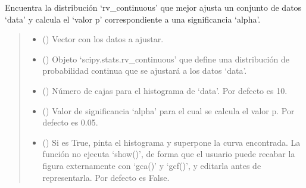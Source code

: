 \documentclass[letterpaper,10pt,english]{sphinxmanual}
\begin{document}
\begin{fulllineitems}
\label{\detokenize{myutils:myutils.stats.fit_rv_cont}}
\pysigstartsignatures
{}
\pysigstopsignatures
\sphinxAtStartPar
Encuentra la distribución ‘rv\_continuous’ que mejor ajusta un conjunto de datos ‘data’ y calcula el ‘valor p’ correspondiente a una significancia ‘alpha’.
\begin{quote}\begin{description}
\begin{itemize}
\item {} 
\sphinxAtStartPar
{} () \textendash{} Vector con los datos a ajustar.

\item {} 
\sphinxAtStartPar
{} () \textendash{} Objeto ‘scipy.stats.rv\_continuous’ que define una distribución de probabilidad continua que se ajustará a los datos ‘data’.

\item {} 
\sphinxAtStartPar
{} (\sphinxstyleliteralemphasis{\sphinxupquote{, }}) \textendash{} Número de cajas para el histograma de ‘data’. Por defecto es 10.

\item {} 
\sphinxAtStartPar
{} (\sphinxstyleliteralemphasis{\sphinxupquote{, }}) \textendash{} Valor de significancia ‘alpha’ para el cual se calcula el valor p. Por defecto es 0.05.

\item {} 
\sphinxAtStartPar
{} (\sphinxstyleliteralemphasis{\sphinxupquote{, }}) \textendash{} Si es True, pinta el histograma y superpone la curva encontrada. La función no ejecuta ‘show()’, de forma que el usuario puede recabar la figura externamente
con ‘gca()’ y ‘gcf()’, y editarla antes de representarla. Por defecto es False.


\end{itemize}
\end{description}
\end{quote}
\end{fulllineitems}
\end{document}
